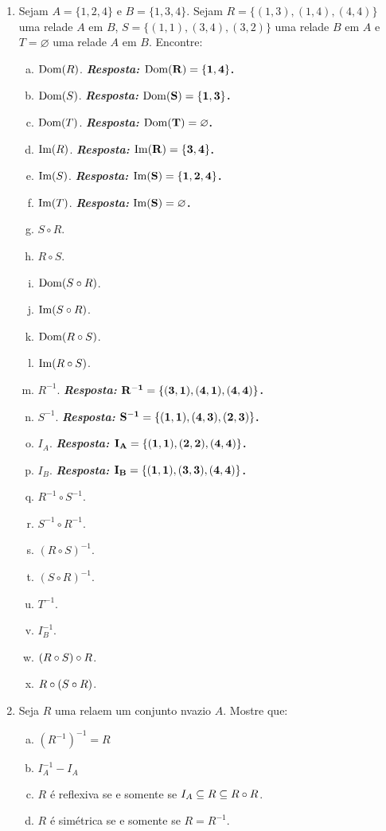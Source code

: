 \begin{enumerate}[{\bf 1.}]

\item Sejam $A=\{1,2,4\}$ e $B=\{1,3,4\}$. Sejam $R=\{(1,3),(1,4),(4,4)\}$ uma rela\cao de $A$ em $B$, $S=\{(1,1),(3,4),(3,2)\}$ uma rela\cao de $B$ em $A$ e $T=\varnothing$ uma rela\cao de $A$ em $B$. Encontre:
\begin{enumerate}[a)]
\item $\operatorname{Dom}(R)$. {\bf{\it Resposta:} ${\bf \operatorname{Dom}(R)=\{1,4\}}$.}
\item $\operatorname{Dom}(S)$. {\bf{\it Resposta:} ${\bf \operatorname{Dom}(S)=\{1,3\}}$.}
\item $\operatorname{Dom}(T)$. {\bf{\it Resposta:} ${\bf \operatorname{Dom}(T)=\varnothing}$.}
\item $\operatorname{Im}(R)$. {\bf{\it Resposta:} ${\bf \operatorname{Im}(R)=\{3,4\}}$.}
\item $\operatorname{Im}(S)$. {\bf{\it Resposta:} ${\bf \operatorname{Im}(S)=\{1,2,4\}}$.}
\item $\operatorname{Im}(T)$. {\bf{\it Resposta:} ${\bf \operatorname{Im}(S)=\varnothing}$.}
\item $S\circ R$.
\item $R\circ S$.
\item $\operatorname{Dom}(S\circ R)$.
\item $\operatorname{Im}(S\circ R)$.
\item $\operatorname{Dom}(R\circ S)$.
\item $\operatorname{Im}(R\circ S)$.
\item $R^{-1}$. {\bf{\it Resposta:} ${\bf R^{-1}=\{(3,1),(4,1),(4,4)\}}$.}
\item $S^{-1}$. {\bf{\it Resposta:} ${\bf S^{-1}=\{(1,1),(4,3),(2,3)\}}$.}
\item $I_A$. {\bf{\it Resposta:} ${\bf I_A=\{(1,1),(2,2),(4,4)\}}$.}
\item $I_B$. {\bf{\it Resposta:} ${\bf I_B=\{(1,1),(3,3),(4,4)\}}$.}
\item $R^{-1}\circ S^{-1}$.
\item $S^{-1}\circ R^{-1}$.
\item $(R\circ S)^{-1}$.
\item $(S\circ R)^{-1}$.
\item $T^{-1}$.
\item $I_B^{-1}$.
\item $(R\circ S)\circ R$.
\item $R\circ(S\circ R)$. 
\end{enumerate}

\item Seja $R$ uma rela\cao em um conjunto n\ao vazio $A$. Mostre que:
\begin{enumerate}[a)]
\item $(R^{-1})^{-1}=R$
\item $I_A^{-1}-I_A$
\item $R$ \'e reflexiva se e somente se $I_A\subseteq R\subseteq R\circ R$.
\item $R$ \'e sim\'etrica se e somente se $R=R^{-1}$. 


\end{enumerate}
\end{enumerate}
